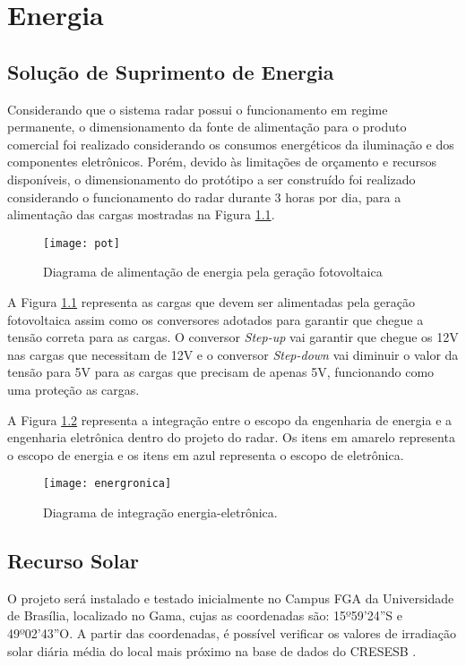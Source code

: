 \chapter{Energia}

\section{Solução de Suprimento de Energia}

Considerando que o sistema radar possui o funcionamento em regime permanente, o dimensionamento da fonte de alimentação para o produto comercial foi realizado considerando os consumos energéticos da iluminação e dos componentes eletrônicos. Porém, devido às limitações de orçamento e recursos disponíveis, o dimensionamento do protótipo a ser construído foi realizado considerando o funcionamento do radar durante 3 horas por dia, para a alimentação das cargas mostradas na Figura \ref{fig30}.

\begin{figure}[H]
\centering 
\texttt{[image: pot]}
\caption{\label{fig30}Diagrama de alimentação de energia pela geração fotovoltaica }
\end{figure}

A Figura \ref{fig30} representa as cargas que devem ser alimentadas pela geração fotovoltaica assim como os conversores adotados para garantir que chegue a tensão correta para as cargas. O conversor \textit{Step-up} vai garantir que chegue os 12V nas cargas que necessitam de 12V e o conversor \textit{Step-down} vai diminuir o valor da tensão para 5V para as cargas que precisam de apenas 5V, funcionando como uma proteção as cargas.

A Figura \ref{fig31} representa a integração entre o escopo da engenharia de energia e a engenharia eletrônica dentro do projeto do radar. Os itens em amarelo representa o escopo de energia e os itens em azul representa o escopo de eletrônica.

\begin{figure}[H]
\centering 
\texttt{[image: energronica]}
\caption{\label{fig31}Diagrama de integração energia-eletrônica.}
\end{figure}

\section{Recurso Solar}

O projeto será instalado e testado inicialmente no Campus FGA da Universidade de Brasília, localizado no Gama, cujas as coordenadas são: 15º59’24”S e 49º02’43”O. A partir das coordenadas, é possível verificar os valores de irradiação solar diária média do local mais próximo na base de dados do CRESESB \cite{solar}.

